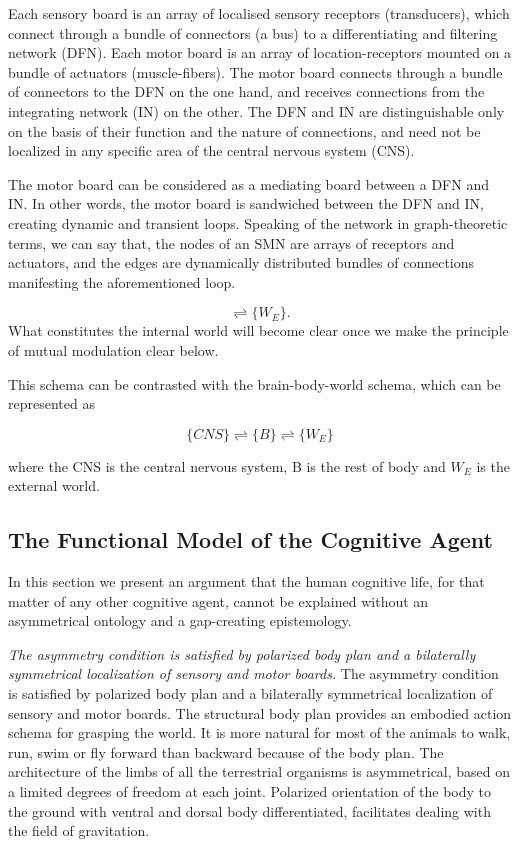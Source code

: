 Each sensory board is an array of localised sensory receptors (transducers), which connect through a bundle of connectors (a bus) to a differentiating and filtering network (DFN). Each motor board is an array of location-receptors mounted on a bundle of actuators (muscle-fibers). The motor board connects through a bundle of connectors to the DFN on the one hand, and receives connections from the integrating network (IN) on the other. The DFN and IN are distinguishable only on the basis of their function and the nature of connections, and need not be localized in any specific area of the central nervous system (CNS).

The motor board can be considered as a mediating board between a DFN and IN. In other words, the motor board is sandwiched between the DFN and IN, creating dynamic and transient loops. Speaking of the network in graph-theoretic terms, we can say that, the nodes of an SMN are arrays of receptors and actuators, and the edges are dynamically distributed bundles of connections manifesting the aforementioned loop.

\begin{equation}
[\{n(SMN)\}_i \rightleftharpoons \{n(SMN)\}_j] \rightleftharpoons \{W_E\}.
\end{equation}
What constitutes the internal world will become clear once we make the principle of mutual modulation clear below.


This schema can be contrasted with the brain-body-world schema, which can be represented as 

\begin{equation}
\{CNS\} \rightleftharpoons \{B\} \rightleftharpoons \{W_E\}
\end{equation}

where the CNS is the central nervous system, B is the rest of body and $W_E$ is the external world.


\subsection{The Functional Model of the Cognitive Agent}


In this section we present an argument that the human cognitive life, for that matter of any other cognitive agent, cannot be explained without an asymmetrical ontology and a gap-creating epistemology.  

\emph{The asymmetry condition is satisfied by polarized body plan and a bilaterally symmetrical localization of sensory and motor boards.} The asymmetry condition is satisfied by polarized body plan and a bilaterally symmetrical localization of sensory and motor boards. 
The structural body plan provides an embodied action schema for grasping the world. It is more natural for most of the animals to walk, run, swim or fly forward than backward because of the body plan. The architecture of the limbs of all the terrestrial organisms is asymmetrical, based on a limited degrees of freedom at each joint. Polarized orientation of the body to the ground with ventral and dorsal body differentiated, facilitates dealing with the field of gravitation. 

